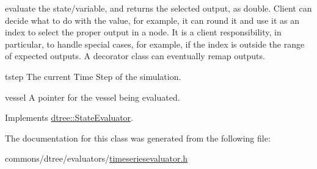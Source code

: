 evaluate the state/variable, and returns the selected output, as double. Client can decide what to do with the value, for example, it can round it and use it as an index to select the proper output in a node. It is a client responsibility, in particular, to handle special cases, for example, if the index is outside the range of expected outputs. A decorator class can eventually remap outputs. 

\begin{DoxyItemize}
\item tstep The current Time Step of the simulation. \item vessel A pointer for the vessel being evaluated. \end{DoxyItemize}


Implements \mbox{\hyperlink{classdtree_1_1_state_evaluator_ab57666219fbdc728f40d9d5acd5726cb}{dtree\+::\+State\+Evaluator}}.



The documentation for this class was generated from the following file\+:\begin{DoxyCompactItemize}
\item 
commons/dtree/evaluators/\mbox{\hyperlink{timeseriesevaluator_8h}{timeseriesevaluator.\+h}}\end{DoxyCompactItemize}
